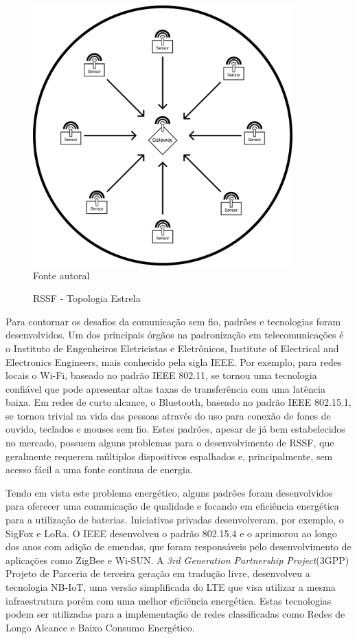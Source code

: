 \begin{figure}[ht]
    \begin{center}
        \caption{RSSF - Topologia Estrela}
        \includegraphics[width=10cm]{./sections/textual/chapters/images/intro_rssf.png}\\
        Fonte autoral
        \label{fig:rssf}
    \end{center}
\end{figure}

Para contornar os desafios da comunicação sem fio, padrões e tecnologias foram desenvolvidos. Um dos principais órgãos na padronização em telecomunicações é o Instituto de Engenheiros Eletricistas e Eletrônicos, Institute of Electrical and Electronics Engineers, mais conhecido pela sigla IEEE. Por exemplo, para redes locais o Wi-Fi, baseado no padrão IEEE 802.11, se tornou uma tecnologia confiável que pode apresentar altas taxas de transferência com uma latência baixa. Em redes de curto alcance, o Bluetooth, baseado no padrão IEEE 802.15.1, se tornou trivial na vida das pessoas através do uso para conexão de fones de ouvido, teclados e mouses sem fio. Estes padrões, apesar de já bem estabelecidos no mercado, possuem alguns problemas para o desenvolvimento de RSSF, que geralmente requerem múltiplos dispositivos espalhados e, principalmente, sem acesso fácil a uma fonte continua de energia.

Tendo em vista este problema energético, alguns padrões foram desenvolvidos para oferecer uma comunicação de qualidade e focando em eficiência energética para a utilização de baterias. Iniciativas privadas desenvolveram, por exemplo, o SigFox e LoRa. O IEEE desenvolveu o padrão 802.15.4 e o aprimorou ao longo dos anos com adição de emendas, que foram responsáveis pelo desenvolvimento de aplicações como ZigBee e Wi-SUN. A \emph{3rd Generation Partnership Project}(3GPP) Projeto de Parceria de terceira geração em tradução livre, desenvolveu a tecnologia NB-IoT, uma versão simplificada do LTE que visa utilizar a mesma infraestrutura porém com uma melhor eficiência energética. Estas tecnologias podem ser utilizadas para a implementação de redes classificadas como Redes de Longo Alcance e Baixo Consumo Energético.

